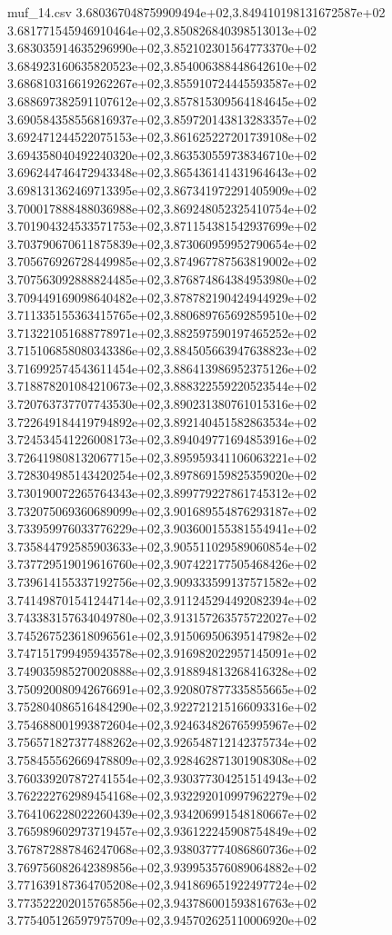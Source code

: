 \begin{filecontents*}{muf_14.csv}
3.680367048759909494e+02,3.849410198131672587e+02
3.681771545946910464e+02,3.850826840398513013e+02
3.683035914635296990e+02,3.852102301564773370e+02
3.684923160635820523e+02,3.854006388448642610e+02
3.686810316619262267e+02,3.855910724445593587e+02
3.688697382591107612e+02,3.857815309564184645e+02
3.690584358556816937e+02,3.859720143813283357e+02
3.692471244522075153e+02,3.861625227201739108e+02
3.694358040492240320e+02,3.863530559738346710e+02
3.696244746472943348e+02,3.865436141431964643e+02
3.698131362469713395e+02,3.867341972291405909e+02
3.700017888488036988e+02,3.869248052325410754e+02
3.701904324533571753e+02,3.871154381542937699e+02
3.703790670611875839e+02,3.873060959952790654e+02
3.705676926728449985e+02,3.874967787563819002e+02
3.707563092888824485e+02,3.876874864384953980e+02
3.709449169098640482e+02,3.878782190424944929e+02
3.711335155363415765e+02,3.880689765692859510e+02
3.713221051688778971e+02,3.882597590197465252e+02
3.715106858080343386e+02,3.884505663947638823e+02
3.716992574543611454e+02,3.886413986952375126e+02
3.718878201084210673e+02,3.888322559220523544e+02
3.720763737707743530e+02,3.890231380761015316e+02
3.722649184419794892e+02,3.892140451582863534e+02
3.724534541226008173e+02,3.894049771694853916e+02
3.726419808132067715e+02,3.895959341106063221e+02
3.728304985143420254e+02,3.897869159825359020e+02
3.730190072265764343e+02,3.899779227861745312e+02
3.732075069360689099e+02,3.901689554876293187e+02
3.733959976033776229e+02,3.903600155381554941e+02
3.735844792585903633e+02,3.905511029589060854e+02
3.737729519019616760e+02,3.907422177505468426e+02
3.739614155337192756e+02,3.909333599137571582e+02
3.741498701541244714e+02,3.911245294492082394e+02
3.743383157634049780e+02,3.913157263575722027e+02
3.745267523618096561e+02,3.915069506395147982e+02
3.747151799495943578e+02,3.916982022957145091e+02
3.749035985270020888e+02,3.918894813268416328e+02
3.750920080942676691e+02,3.920807877335855665e+02
3.752804086516484290e+02,3.922721215166093316e+02
3.754688001993872604e+02,3.924634826765995967e+02
3.756571827377488262e+02,3.926548712142375734e+02
3.758455562669478809e+02,3.928462871301908308e+02
3.760339207872741554e+02,3.930377304251514943e+02
3.762222762989454168e+02,3.932292010997962279e+02
3.764106228022260439e+02,3.934206991548180667e+02
3.765989602973719457e+02,3.936122245908754849e+02
3.767872887846247068e+02,3.938037774086860736e+02
3.769756082642389856e+02,3.939953576089064882e+02
3.771639187364705208e+02,3.941869651922497724e+02
3.773522202015765856e+02,3.943786001593816763e+02
3.775405126597975709e+02,3.945702625110006920e+02

\end{filecontents*}

